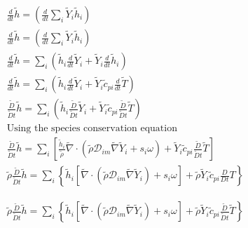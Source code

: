 \documentclass[preprint,12pt,authoryear]{elsarticle}
\begin{document}
\begin{equation}
\begin{split}
        \frac{d}{dt}\tilde{h}
        =
        \left(
                \frac{d}{dt}
		\sum\limits_i\tilde{Y}_i\tilde{h}_i
        \right)
\\
	\frac{d}{dt}\tilde{h}
        =
        \left(
                \frac{d}{dt}
		\sum\limits_i\tilde{Y}_i
		\tilde{h}_i
        \right)
\\
	\frac{d}{dt}\tilde{h}
        =
        \sum\limits_i
        \left(
                \tilde{h}_i
                \frac{d}{dt}
		\tilde{Y}_i
                +
                \tilde{Y}_i
                \frac{d}{dt}
		\tilde{h}_i
        \right)
\\
	\frac{d}{dt}\tilde{h}
        =
        \sum\limits_i
        \left(
                \tilde{h}_i
                \frac{d}{dt}
		\tilde{Y}_i
                +
                \tilde{Y}_i
                \tilde{c}_{pi}
                \frac{d}{dt}
		\tilde{T}
        \right)
\\
	\frac{\tilde{D}}{\tilde{D} t}
	\tilde{h}
        =
        \sum\limits_i
        \left(
                \tilde{h}_i
		\frac{\tilde{D}}{\tilde{D} t}
		\tilde{Y}_i
                +
                \tilde{Y}_i
                \tilde{c}_{pi}
		\frac{\tilde{D}}{\tilde{D} t}
		\tilde{T}
        \right)
\\
\text{Using the species conservation equation}
\\
	\frac{\tilde{D}}{\tilde{D} t}
	\tilde{h}
        =
        \sum\limits_i
        \left[
                \frac{\tilde{h}_i}{\tilde{\rho}}
                \tilde{\nabla}\cdot
                (
		\tilde{\rho}\mathcal{D}_{im}\tilde{\nabla}\tilde{Y}_i
		+
        	s_i \omega
		)
                +
                \tilde{Y}_i
                \tilde{c}_{pi}
		\frac{\tilde{D}}{\tilde{D} t}
		\tilde{T}
        \right]
\\
        \tilde{\rho}
	\frac{\tilde{D}}{\tilde{D} t}
	\tilde{h}
        =
        \sum\limits_i
        \left\{
                \tilde{h}_i
                [
                	\tilde{\nabla}\cdot
			   (
			\tilde{\rho}\mathcal{D}_{im}\tilde{\nabla}\tilde{Y}_i
			)
			+
        		s_i \omega
		    ]
                +
                \tilde{\rho}
                \tilde{Y}_i
                \tilde{c}_{pi}
        	\frac{D}{Dt}T
        \right\}
\end{split}
\end{equation}

\begin{equation}
\begin{split}
        \tilde{\rho}
        \frac{\tilde{D}}{\tilde{D} t}\tilde{h}
        =
        \sum\limits_i
        \left\{
                \tilde{h}_i
                [
                	\tilde{\nabla}\cdot
		     	(
			\tilde{\rho}\mathcal{D}_{im}\tilde{\nabla}\tilde{Y}_i
			)
			+
        		s_i \omega
	        	]
                +
                \tilde{\rho}
                \tilde{Y}_i
                \tilde{c}_{pi}
                \frac{\tilde{D}}{\tilde{D} t}
                \tilde{T}
        \right\}
\end{split}
\end{equation}
\end{document}
